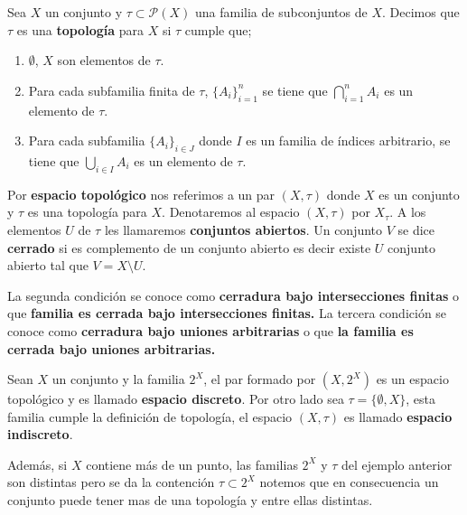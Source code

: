 \begin{df}
Sea $X$ un conjunto y $\tau \subset \mathcal{P}(X)$ una familia de subconjuntos de $X$. Decimos que $\tau$ es una \textbf{topología} para $X$ si $\tau$ cumple que;

	\begin{enumerate}
	\item $\emptyset$, $X$ son elementos de  $\tau.$
	
	\item Para cada subfamilia finita de $\tau$, $\{A_i\}_{i=1}^n$ se tiene que $\bigcap_{i=1}^n A_i$ es un elemento de $\tau.$ 
	
	\item Para cada subfamilia $\{A_i\}_{i \in J}$ donde $I$ es un familia de índices arbitrario, se tiene que $\bigcup_{i \in I} A_i$ es un elemento de $\tau$.
	\end{enumerate}

Por \textbf{espacio topológico} nos referimos a un par $(X,\tau)$ donde $X$ es un conjunto y $\tau$ es una topología para $X$. Denotaremos al espacio $(X, \tau)$ por $X_{\tau}$. A los elementos $U$ de $\tau$  les llamaremos \textbf{conjuntos abiertos}. Un conjunto $V$ se dice \textbf{cerrado} si es complemento de un conjunto abierto es decir existe $U$ conjunto abierto tal que $V=X \setminus U$.  
\end{df}


\begin{nt}
La segunda condición se conoce como \textbf{cerradura bajo intersecciones finitas} o que \textbf{familia es cerrada bajo intersecciones finitas.} La tercera condición se conoce como \textbf{cerradura bajo uniones arbitrarias} o que \textbf{la familia es cerrada bajo uniones arbitrarias.}
\end{nt}


\begin{ej}
Sean $X$ un conjunto y la familia $2^X$, el par formado por $(X, 2^X)$ es un espacio topológico y es llamado \textbf{espacio discreto}. Por otro lado sea $\tau=\{\emptyset, X\}$, esta familia cumple la definición de topología, el espacio $(X, \tau)$ es llamado \textbf{espacio indiscreto}.
\end{ej}

Además, si $X$ contiene más de un punto, las familias $2^X$ y $\tau$ del ejemplo anterior son distintas pero se da la contención  $\tau \subset 2^X$ notemos que en consecuencia un conjunto puede tener mas de una topología y entre ellas distintas. 

